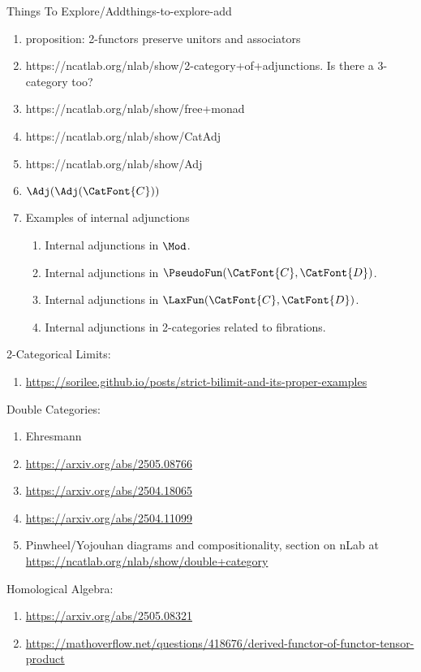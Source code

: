 \begin{remark}{Things To Explore/Add}{things-to-explore-add}
\begin{enumerate}
        \item proposition: 2-functors preserve unitors and associators
        \item https://ncatlab.org/nlab/show/2-category+of+adjunctions. Is there a 3-category too?
        \item https://ncatlab.org/nlab/show/free+monad
        \item https://ncatlab.org/nlab/show/CatAdj
        \item https://ncatlab.org/nlab/show/Adj
        \item $\Adj(\Adj(\CatFont{C}))$
        \item Examples of internal adjunctions
            \begin{enumerate}
                \item Internal adjunctions in $\Mod$.
                \item Internal adjunctions in $\PseudoFun(\CatFont{C},\CatFont{D})$.
                \item Internal adjunctions in $\LaxFun(\CatFont{C},\CatFont{D})$.
                \item Internal adjunctions in 2-categories related to fibrations.
            \end{enumerate}
    \end{enumerate}
    2-Categorical Limits:
    \begin{enumerate}
        \item \url{https://sorilee.github.io/posts/strict-bilimit-and-its-proper-examples}
    \end{enumerate}
    Double Categories:
    \begin{enumerate}
        \item Ehresmann
        \item \url{https://arxiv.org/abs/2505.08766}
        \item \url{https://arxiv.org/abs/2504.18065}
        \item \url{https://arxiv.org/abs/2504.11099}
        \item Pinwheel/Yojouhan diagrams and compositionality, section on nLab at \url{https://ncatlab.org/nlab/show/double+category}
    \end{enumerate}
    Homological Algebra:
    \begin{enumerate}
        \item \url{https://arxiv.org/abs/2505.08321}
        \item \url{https://mathoverflow.net/questions/418676/derived-functor-of-functor-tensor-product}

\end{enumerate}
\end{remark}
